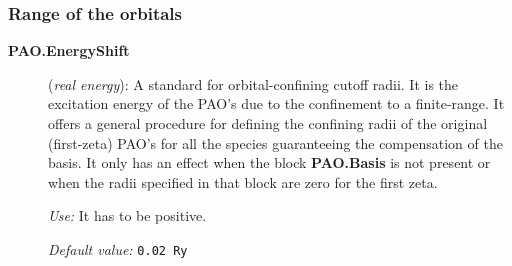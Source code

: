 \documentclass[11pt]{article}
\begin{document}
\subsubsection{Range of the orbitals}

\begin{description}
\item[{\bf PAO.EnergyShift}] ({\it real energy}): A standard for
orbital-confining cutoff radii. It is the excitation energy
of the PAO's due to the confinement to a finite-range. It offers a
general procedure for defining the confining radii of the original
(first-zeta) PAO's for all the species guaranteeing the compensation
of the basis. It only has an effect when the block
{\bf PAO.Basis} is not present or when the radii
specified in that block are zero for the first zeta.

{\it Use:} It has to be positive.

{\it Default value:} {\tt 0.02 Ry}

\end{description}
\end{document}
